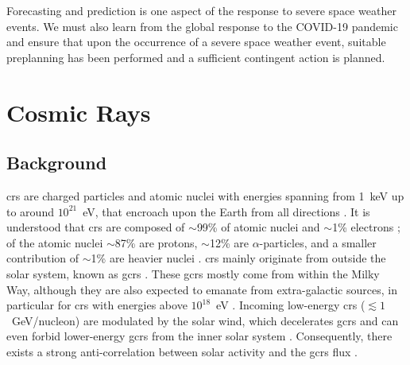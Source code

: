 Forecasting and prediction is one aspect of the response to severe space weather events. We must also learn from the global response to the COVID-19 pandemic and ensure that upon the occurrence of a severe space weather event, suitable preplanning has been performed and a sufficient contingent action is planned.





\glsresetall 
{}
\section{Cosmic Rays}\label{sec:intro_CRs}

\subsection{Background}

\glspl{cr} are charged particles and atomic nuclei with energies spanning from 1~keV up to around $10^{21}$~eV, that encroach upon the Earth from all directions \citep{giacalone_energetic_2010}. It is understood that \glspl{cr} are composed of $\sim$99\% of atomic nuclei and $\sim$1\% electrons \citep{gaisser_cosmic_2016}; of the atomic nuclei $\sim$87\% are protons, $\sim$12\% are $\alpha$-particles, and a smaller contribution of $\sim$1\% are heavier nuclei \citep{grupen_astroparticle_2005, dunai_cosmic_2010, particle_data_group_review_2020}. \glspl{cr} mainly originate from outside the solar system, known as \glspl{gcr} \citep{particle_data_group_review_2020}. These \glspl{gcr} mostly come from within the Milky Way, although they are also expected to emanate from extra-galactic sources, in particular for \glspl{cr} with energies above $10^{18}$~eV \citep{aab_observation_2017}. Incoming low-energy \glspl{cr} ($\lesssim1$~GeV/nucleon) are modulated by the solar wind, which decelerates \glspl{gcr} and can even forbid lower-energy \glspl{gcr} from the inner solar system \citep{grupen_astroparticle_2005}. Consequently, there exists a strong anti-correlation between solar activity and the \glspl{gcr} flux \citep{particle_data_group_review_2020}.

